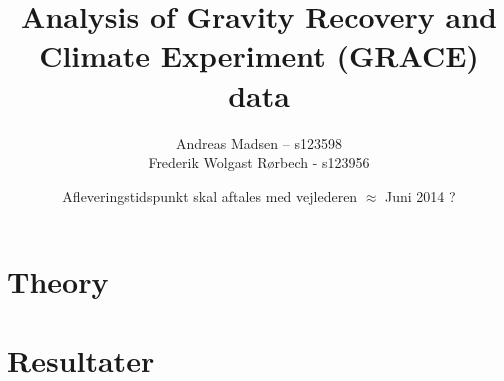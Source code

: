 \documentclass[a4paper]{article}
\numberwithin{equation}{section}
\numberwithin{figure}{section}
\numberwithin{table}{section}
\begin{document}
\title{Analysis of Gravity Recovery and Climate Experiment (GRACE) data}
\author{Andreas Madsen – s123598\\Frederik Wolgast Rørbech - s123956}
\date{Afleveringstidspunkt skal aftales med vejlederen $\approx$ Juni 2014 ?}
\maketitle

\setcounter{tocdepth}{2}
\tableofcontents
\pagebreak





\pagebreak
\section{Theory}






\section{Resultater}



\pagebreak


\pagebreak
\printbibliography
\end{document}
